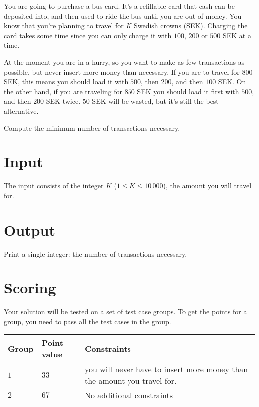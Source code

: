 You are going to purchase a bus card.
It's a refillable card that cash can be deposited into, and then used to ride the bus until you are out of money.
You know that you're planning to travel for $K$ Swedish crowns (SEK).
Charging the card takes some time since you can only charge it with $100$, $200$ or $500$ SEK at a time.

At the moment you are in a hurry, so you want to make as few transactions as possible, but never insert more money than necessary.
If you are to travel for $800$ SEK, this means you should load it with $500$, then $200$, and then $100$ SEK.
On the other hand, if you are traveling for $850$ SEK you should load it first with $500$, and then $200$ SEK twice.
$50$ SEK will be wasted, but it's still the best alternative.

Compute the minimum number of transactions necessary.

\section*{Input}
The input consists of the integer $K$ ($1 \le K \le 10\,000$), the amount you will travel for.

\section*{Output}
Print a single integer: the number of transactions necessary.

\section*{Scoring}
Your solution will be tested on a set of test case groups.
To get the points for a group, you need to pass all the test cases in the group.

\noindent
\begin{tabular}{| l | l | p{10cm} |}
    \hline
    \textbf{Group} & \textbf{Point value} & \textbf{Constraints} \\ \hline
    $1$    & $33$        & you will never have to insert more money than the amount you travel for. \\ \hline 
    $2$    & $67$        & No additional constraints \\ \hline
\end{tabular}
